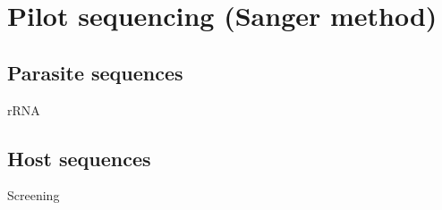 
\chapter{Pilot sequencing (Sanger method)} %



\ifpdf
    \graphicspath{{pilot/figures/PNG/}{pilot/figures/PDF/}{pilot/figures/}}
\else
    \graphicspath{{pilot/figures/EPS/}{pilot/figures/}}
\fi


\section{Parasite sequences}

rRNA

\section{Host sequences}

Screening


